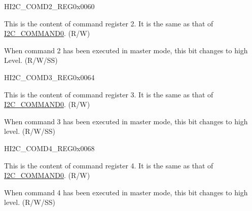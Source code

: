 \begin{register}{H}{I2C\_COMD2\_REG}{0x0060}\label{regdesc:I2CCOMD2REG}
%
%
%
\regnewline%
\begin{regdesc}\begin{reglist}
\label{fielddesc:I2CCOMMAND2}\item [I2C\_COMMAND2] This is the content of command register 2. It is the same as that of \hyperref[fielddesc:I2CCOMMAND0]{I2C\_COMMAND0}. (R/W)
\label{fielddesc:I2CCOMMAND2DONE}\item [I2C\_COMMAND2\_DONE] When command 2 has been executed in master mode, this bit changes to high
Level. (R/W/SS)
\end{reglist}\end{regdesc}
\end{register}


\begin{register}{H}{I2C\_COMD3\_REG}{0x0064}\label{regdesc:I2CCOMD3REG}
%
%
%
\regnewline%
\begin{regdesc}\begin{reglist}
\label{fielddesc:I2CCOMMAND3}\item [I2C\_COMMAND3] This is the content of command register 3. It is the same as that of \hyperref[fielddesc:I2CCOMMAND0]{I2C\_COMMAND0}. (R/W)
\label{fielddesc:I2CCOMMAND3DONE}\item [I2C\_COMMAND3\_DONE] When command 3 has been executed in master mode, this bit changes to high level. (R/W/SS)
\end{reglist}\end{regdesc}
\end{register}


\begin{register}{H}{I2C\_COMD4\_REG}{0x0068}\label{regdesc:I2CCOMD4REG}
%
%
%
\regnewline%
\begin{regdesc}\begin{reglist}
\label{fielddesc:I2CCOMMAND4}\item [I2C\_COMMAND4] This is the content of command register 4. It is the same as that of \hyperref[fielddesc:I2CCOMMAND0]{I2C\_COMMAND0}. (R/W)
\label{fielddesc:I2CCOMMAND4DONE}\item [I2C\_COMMAND4\_DONE] When command 4 has been executed in master mode, this bit changes to high level. (R/W/SS)
\end{reglist}\end{regdesc}
\end{register}


